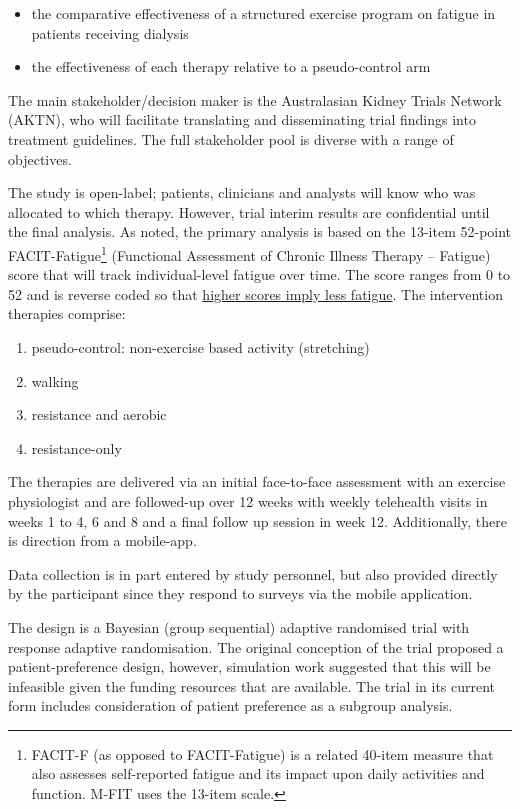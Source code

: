 \documentclass[
]{article}
\begin{document}
\begin{itemize}
  \item the comparative effectiveness of a structured exercise program on fatigue in patients receiving dialysis
  \item the effectiveness of each therapy relative to a pseudo-control arm
\end{itemize}

The main stakeholder/decision maker is the Australasian Kidney Trials Network (AKTN), who will facilitate translating and disseminating trial findings into treatment guidelines.
The full stakeholder pool is diverse with a range of objectives.

The study is open-label; patients, clinicians and analysts will know who was allocated to which therapy.
However, trial interim results are confidential until the final analysis.
As noted, the primary analysis is based on the 13-item 52-point FACIT-Fatigue\footnote{FACIT-F (as opposed to FACIT-Fatigue) is a related 40-item measure that also assesses self-reported fatigue and its impact upon daily activities and function. M-FIT uses the 13-item scale.} (Functional Assessment of Chronic Illness Therapy – Fatigue) score that will track individual-level fatigue over time.
The score ranges from 0 to 52 and is reverse coded so that \underline{higher scores imply less fatigue}.
The intervention therapies comprise:

\begin{enumerate}
  \item pseudo-control: non-exercise based activity (stretching)
  \item walking
  \item resistance and aerobic
  \item resistance-only
\end{enumerate}

The therapies are delivered via an initial face-to-face assessment with an exercise physiologist and are followed-up over 12 weeks with weekly telehealth visits in weeks 1 to 4, 6 and 8 and a final follow up session in week 12.
Additionally, there is direction from a mobile-app.

Data collection is in part entered by study personnel, but also provided directly by the participant since they respond to surveys via the mobile application.

The design is a Bayesian (group sequential) adaptive randomised trial with response adaptive randomisation.
The original conception of the trial proposed a patient-preference design, however, simulation work suggested that this will be infeasible given the funding resources that are available.
The trial in its current form includes consideration of patient preference as a subgroup analysis.
\end{document}
